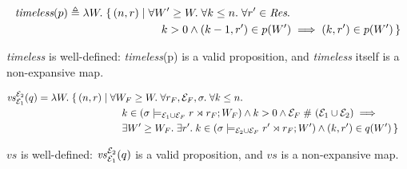 
\begin{align*}
	\textit{timeless}(p) \eqdef 
	\begin{aligned}[t]
		\Lam W.
		\{\, (n, r) &\mid \All W' \geq W. \All k \leq n. \All r' \in \textdom{Res}. \\
		&\qquad
		k > 0 \land (k - 1, r') \in p(W') \implies (k, r') \in p(W') \,\}
	\end{aligned}
\end{align*}

\begin{lem}
	\textit{timeless} is well-defined: \textit{timeless}(p) is a valid proposition, and \textit{timeless} itself is a non-expansive map.
\end{lem}


\begin{align*}
	\mathit{vs}_{\mask_1}^{\mask_2}(q) &= \Lam W.
	\begin{aligned}[t]
		\{\, (n, \rs) &\mid \All W_F \geq W. \All \rs_F, \mask_F, \state. \All k \leq n.\\
		&\qquad 
		k \in (\fullSat{\state}{\mask_1 \cup \mask_F}{\rs \rtimes \rs_F}{W_F}) \land k > 0 \land \mask_F \sep (\mask_1 \cup \mask_2) \implies{} \\
		&\qquad
		\Exists W' \geq W_F. \Exists \rs'. k \in (\fullSat{\state}{\mask_2 \cup \mask_F}{\rs' \rtimes \rs_F}{W'}) \land (k, \rs') \in q(W')
		\,\}
	\end{aligned}
\end{align*}
\begin{lem}
	$\mathit{vs}$ is well-defined: $\mathit{vs}_{\mathcal{E}_1}^{\mathcal{E}_2}(q)$ is a valid proposition, and $\mathit{vs}$ is a non-expansive map.
\end{lem}




